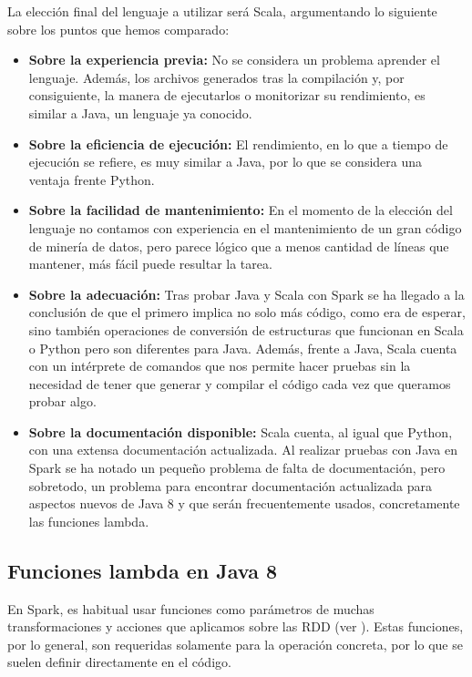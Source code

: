 \newpage


La elección final del lenguaje a utilizar será Scala, argumentando lo siguiente sobre los puntos que hemos comparado:

\begin{itemize}
	\item \textbf{Sobre la experiencia previa:} No se considera un problema aprender el lenguaje. Además, los archivos generados tras la compilación y, por consiguiente, la manera de ejecutarlos o monitorizar su rendimiento, es similar a Java, un lenguaje ya conocido.
	\item \textbf{Sobre la eficiencia de ejecución:} El rendimiento, en lo que a tiempo de ejecución se refiere, es muy similar a Java, por lo que se considera una ventaja frente Python.
	\item \textbf{Sobre la facilidad de mantenimiento:} En el momento de la elección del lenguaje no contamos con experiencia en el mantenimiento de un gran código de minería de datos, pero parece lógico que a menos cantidad de líneas que mantener, más fácil puede resultar la tarea.	
	\item \textbf{Sobre la adecuación:} Tras probar Java y Scala con Spark se ha llegado a la conclusión de que el primero implica no solo más código, como era de esperar, sino también operaciones de conversión de estructuras que funcionan en Scala o Python pero son diferentes para Java. Además, frente a Java, Scala cuenta con un intérprete de comandos que nos permite hacer pruebas sin la necesidad de tener que generar y compilar el código cada vez que queramos probar algo.
	\item \textbf{Sobre la documentación disponible:} Scala cuenta, al igual que Python, con una extensa documentación actualizada. Al realizar pruebas con Java en Spark se ha notado un pequeño problema de falta de documentación, pero sobretodo, un problema para encontrar documentación actualizada para aspectos nuevos de Java 8 y que serán frecuentemente usados, concretamente las funciones lambda.
\end{itemize}

\newpage
\subsection{Funciones lambda en Java 8 } \label{subsec:ExplLambdaJava}

En Spark, es habitual usar funciones como parámetros de muchas transformaciones y acciones que aplicamos sobre las RDD (ver ). Estas funciones, por lo general, son requeridas solamente para la operación concreta, por lo que se suelen definir directamente en el código.

